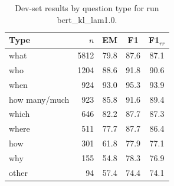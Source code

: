 \begin{table}[t]
\centering\small
\begin{tabular}{lrccc}
\toprule
\textbf{Type} & $n$ & \textbf{EM} & \textbf{F1} & \textbf{F1$_{rr}$} \\
\midrule
what & 5812 & 79.8 & 87.6 & 87.1 \\
who & 1204 & 88.6 & 91.8 & 90.6 \\
when & 924 & 93.0 & 95.3 & 93.9 \\
how many/much & 923 & 85.8 & 91.6 & 89.4 \\
which & 646 & 82.2 & 87.7 & 87.3 \\
where & 511 & 77.7 & 87.7 & 86.4 \\
how & 301 & 61.8 & 77.9 & 77.1 \\
why & 155 & 54.8 & 78.3 & 76.9 \\
other & 94 & 57.4 & 74.4 & 74.1 \\
\bottomrule
\end{tabular}
\caption{Dev-set results by question type for run bert\_kl\_lam1.0.}
\label{tab:qtypes}
\end{table}
